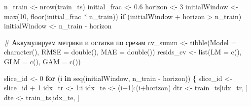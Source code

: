 \documentclass[
  letterpaper,
  DIV=11,
  numbers=noendperiod]{scrreprt}
\newenvironment{Shaded}{\begin{snugshade}}{\end{snugshade}}
\newcommand{\AttributeTok}[1]{\textcolor[rgb]{0.40,0.45,0.13}{#1}}
\newcommand{\CommentTok}[1]{\textcolor[rgb]{0.37,0.37,0.37}{#1}}
\newcommand{\ControlFlowTok}[1]{\textcolor[rgb]{0.00,0.23,0.31}{\textbf{#1}}}
\newcommand{\DecValTok}[1]{\textcolor[rgb]{0.68,0.00,0.00}{#1}}
\newcommand{\FloatTok}[1]{\textcolor[rgb]{0.68,0.00,0.00}{#1}}
\newcommand{\FunctionTok}[1]{\textcolor[rgb]{0.28,0.35,0.67}{#1}}
\newcommand{\NormalTok}[1]{\textcolor[rgb]{0.00,0.23,0.31}{#1}}
\newcommand{\OtherTok}[1]{\textcolor[rgb]{0.00,0.23,0.31}{#1}}
\newcommand{\SpecialCharTok}[1]{\textcolor[rgb]{0.37,0.37,0.37}{#1}}
\begin{document}
\begin{Shaded}
\begin{Highlighting}[]
\NormalTok{n\_train }\OtherTok{\textless{}{-}} \FunctionTok{nrow}\NormalTok{(train\_ts)}
\NormalTok{initial\_frac }\OtherTok{\textless{}{-}} \FloatTok{0.6}
\NormalTok{horizon      }\OtherTok{\textless{}{-}} \DecValTok{3}
\NormalTok{initialWindow }\OtherTok{\textless{}{-}} \FunctionTok{max}\NormalTok{(}\DecValTok{10}\NormalTok{, }\FunctionTok{floor}\NormalTok{(initial\_frac }\SpecialCharTok{*}\NormalTok{ n\_train))}
\ControlFlowTok{if}\NormalTok{ (initialWindow }\SpecialCharTok{+}\NormalTok{ horizon }\SpecialCharTok{\textgreater{}}\NormalTok{ n\_train) initialWindow }\OtherTok{\textless{}{-}}\NormalTok{ n\_train }\SpecialCharTok{{-}}\NormalTok{ horizon}

\CommentTok{\# Аккумулируем метрики и остатки по срезам}
\NormalTok{cv\_summ }\OtherTok{\textless{}{-}} \FunctionTok{tibble}\NormalTok{(}\AttributeTok{Model =} \FunctionTok{character}\NormalTok{(), }\AttributeTok{RMSE =} \FunctionTok{double}\NormalTok{(), }\AttributeTok{MAE =} \FunctionTok{double}\NormalTok{())}
\NormalTok{resids\_cv }\OtherTok{\textless{}{-}} \FunctionTok{list}\NormalTok{(}\AttributeTok{LM =} \FunctionTok{c}\NormalTok{(), }\AttributeTok{GLM =} \FunctionTok{c}\NormalTok{(), }\AttributeTok{GAM =} \FunctionTok{c}\NormalTok{())}

\NormalTok{slice\_id }\OtherTok{\textless{}{-}} \DecValTok{0}
\ControlFlowTok{for}\NormalTok{ (i }\ControlFlowTok{in} \FunctionTok{seq}\NormalTok{(initialWindow, n\_train }\SpecialCharTok{{-}}\NormalTok{ horizon)) \{}
\NormalTok{  slice\_id }\OtherTok{\textless{}{-}}\NormalTok{ slice\_id }\SpecialCharTok{+} \DecValTok{1}
\NormalTok{  idx\_tr }\OtherTok{\textless{}{-}} \DecValTok{1}\SpecialCharTok{:}\NormalTok{i}
\NormalTok{  idx\_te }\OtherTok{\textless{}{-}}\NormalTok{ (i}\SpecialCharTok{+}\DecValTok{1}\NormalTok{)}\SpecialCharTok{:}\NormalTok{(i}\SpecialCharTok{+}\NormalTok{horizon)}
\NormalTok{  dtr }\OtherTok{\textless{}{-}}\NormalTok{ train\_ts[idx\_tr, ]}
\NormalTok{  dte }\OtherTok{\textless{}{-}}\NormalTok{ train\_ts[idx\_te, ]}


\end{Highlighting}
\end{Shaded}
\end{document}
